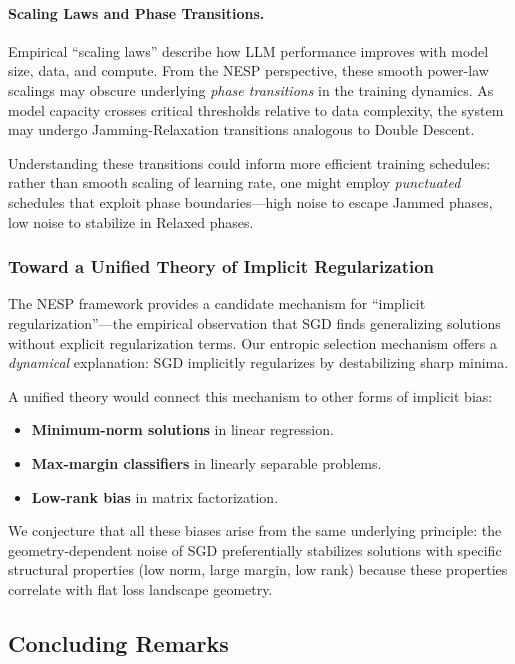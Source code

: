 \documentclass[
  journal=largetwo,
  year=2025,
  volume=37,
]{cup-journal}
\begin{document}
\paragraph{Scaling Laws and Phase Transitions.} Empirical ``scaling laws'' \cite{kaplan2020scaling} describe how LLM performance improves with model size, data, and compute. From the NESP perspective, these smooth power-law scalings may obscure underlying \textit{phase transitions} in the training dynamics. As model capacity crosses critical thresholds relative to data complexity, the system may undergo Jamming-Relaxation transitions analogous to Double Descent.

Understanding these transitions could inform more efficient training schedules: rather than smooth scaling of learning rate, one might employ \textit{punctuated} schedules that exploit phase boundaries---high noise to escape Jammed phases, low noise to stabilize in Relaxed phases.

\subsubsection{Toward a Unified Theory of Implicit Regularization}

The NESP framework provides a candidate mechanism for ``implicit regularization''---the empirical observation that SGD finds generalizing solutions without explicit regularization terms. Our entropic selection mechanism offers a \textit{dynamical} explanation: SGD implicitly regularizes by destabilizing sharp minima.

A unified theory would connect this mechanism to other forms of implicit bias:
\begin{itemize}
    \item \textbf{Minimum-norm solutions} in linear regression.
    \item \textbf{Max-margin classifiers} in linearly separable problems.
    \item \textbf{Low-rank bias} in matrix factorization.
\end{itemize}

We conjecture that all these biases arise from the same underlying principle: the geometry-dependent noise of SGD preferentially stabilizes solutions with specific structural properties (low norm, large margin, low rank) because these properties correlate with flat loss landscape geometry.

\subsection{Concluding Remarks}
\end{document}

